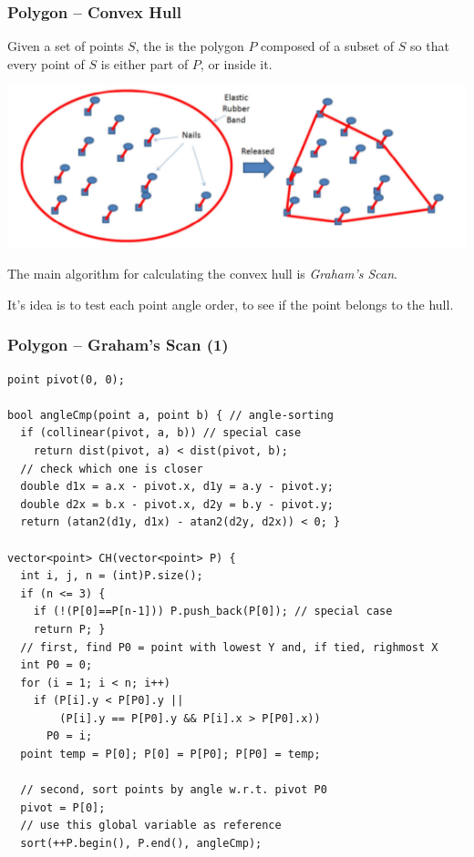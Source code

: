 \documentclass{beamer}
\begin{document}
\begin{frame}
  \frametitle{Polygon -- Convex Hull}
  {\smaller
    \begin{block}{}
      Given a set of points $S$, the  is the
      polygon $P$ composed of a subset of $S$ so that every point of
      $S$ is either part of $P$, or inside it.
    \end{block}


    \begin{center}
      \includegraphics[width=.8\textwidth]{../img/convexhull_halim}
    \end{center}


    \begin{block}{}
      The main algorithm for calculating the convex hull is
      \emph{Graham's Scan}. 

      \medskip
      
      It's idea is to test each point angle order, to see if the point
      belongs to the hull.
    \end{block}
  }
\end{frame}

\begin{frame}[fragile]
  \frametitle{Polygon -- Graham's Scan (1)}

{\tiny 
\begin{exampleblock}{}
\begin{verbatim}
point pivot(0, 0);

bool angleCmp(point a, point b) { // angle-sorting
  if (collinear(pivot, a, b)) // special case
    return dist(pivot, a) < dist(pivot, b);
  // check which one is closer
  double d1x = a.x - pivot.x, d1y = a.y - pivot.y;
  double d2x = b.x - pivot.x, d2y = b.y - pivot.y;
  return (atan2(d1y, d1x) - atan2(d2y, d2x)) < 0; }

vector<point> CH(vector<point> P) {
  int i, j, n = (int)P.size();
  if (n <= 3) {
    if (!(P[0]==P[n-1])) P.push_back(P[0]); // special case
    return P; }
  // first, find P0 = point with lowest Y and, if tied, righmost X
  int P0 = 0;
  for (i = 1; i < n; i++)
    if (P[i].y < P[P0].y || 
        (P[i].y == P[P0].y && P[i].x > P[P0].x))
      P0 = i;
  point temp = P[0]; P[0] = P[P0]; P[P0] = temp;

  // second, sort points by angle w.r.t. pivot P0
  pivot = P[0];
  // use this global variable as reference
  sort(++P.begin(), P.end(), angleCmp);
\end{verbatim}
\end{exampleblock}}
\end{frame}
\end{document}
